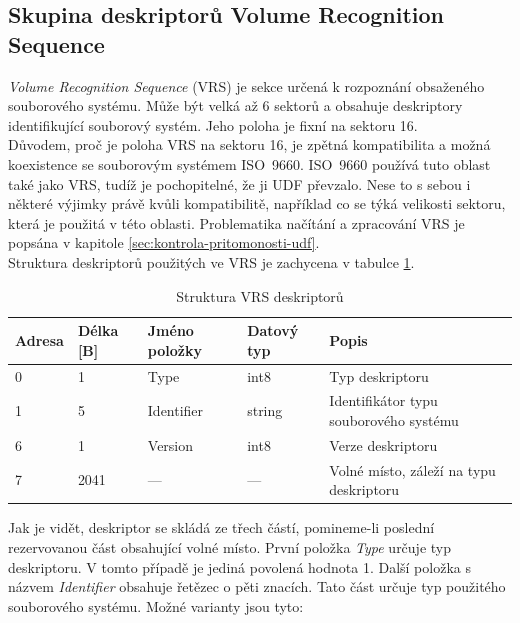 \subsection{Skupina deskriptorů Volume Recognition Sequence}
\label{subsec:vrs}
\textit{Volume Recognition Sequence} (VRS) je sekce určená k rozpoznání obsaženého souborového systému. Může být velká až 6 sektorů a obsahuje deskriptory identifikující souborový systém. Jeho poloha je fixní na sektoru 16.\\
Důvodem, proč je poloha VRS na sektoru 16, je zpětná kompatibilita a možná koexistence se souborovým systémem ISO~9660. ISO~9660 používá tuto oblast také jako VRS, tudíž je pochopitelné, že ji UDF převzalo. Nese to s sebou i některé výjimky právě kvůli kompatibilitě, například co se týká velikosti sektoru, která je použitá v této oblasti. Problematika načítání a zpracování VRS je popsána v kapitole \ref{sec:kontrola-pritomonosti-udf}.\\
Struktura deskriptorů použitých ve VRS je zachycena v tabulce \ref{tab:vrs}.\\
\begin{table}
    \centering
    \begin{tabular}{ | l | l | l | l | l | }
        \hline
        Adresa  & Délka [B]   & Jméno položky & Datový typ    & Popis \\ \hline\hline
        0       & 1             & Type           & int8          & Typ deskriptoru \\ \hline
        1       & 5             & Identifier & string        & Identifikátor typu souborového systému \\ \hline
        6       & 1             & Version         & int8          & Verze deskriptoru \\ \hline
        7       & 2041          & ---           & ---           & Volné místo, záleží na typu deskriptoru \\ \hline
    \end{tabular}
    \caption{Struktura VRS deskriptorů\label{tab:vrs}}
\end{table}
Jak je vidět, deskriptor se skládá ze třech částí, pomineme-li poslední rezervovanou část obsahující volné místo. První položka \textit{Type} určuje typ deskriptoru. V tomto případě je jediná povolená hodnota 1. Další položka s názvem \textit{Identifier} obsahuje řetězec o pěti znacích. Tato část určuje typ použitého souborového systému. Možné varianty jsou tyto:
